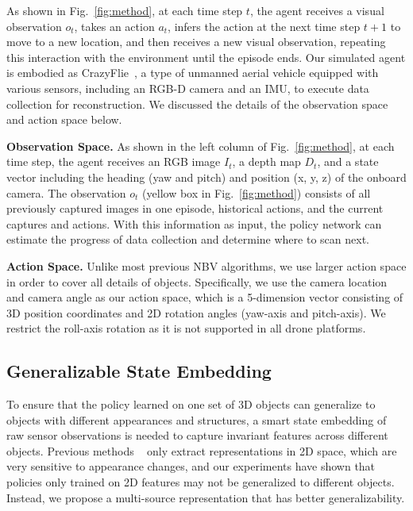     As shown in Fig.~\ref{fig:method}, at each time step $t$, the agent receives a visual observation $o_t$, takes an action $a_t$, infers the action at the next time step $t+1$ to move to a new location, and then receives a new visual observation, repeating this interaction with the environment until the episode ends. Our simulated agent is embodied as CrazyFlie~\citep{giernacki2017crazyflie}, a type of unmanned aerial vehicle equipped with various sensors, including an RGB-D camera and an IMU, to execute data collection for reconstruction. We discussed the details of the observation space and action space below.

    \vspace{1pt}
    \noindent\textbf{Observation Space.} As shown in the left column of Fig.~\ref{fig:method}, at each time step, the agent receives an RGB image $I_t$, a depth map $D_t$, and a state vector including the heading (yaw and pitch) and position (x, y, z) of the onboard camera.
    The observation $o_t$ (yellow box in Fig.~\ref{fig:method}) consists of all previously captured images in one episode, historical actions, and the current captures and actions. With this information as input, the policy network can estimate the progress of data collection and determine where to scan next.

    \vspace{1pt}
    \noindent\textbf{Action Space.} Unlike most previous NBV algorithms, we use larger action space in order to cover all details of objects. Specifically, we use the camera location and camera angle as our action space, which is a 5-dimension vector consisting of 3D position coordinates and 2D rotation angles (yaw-axis and pitch-axis). We restrict the roll-axis rotation as it is not supported in all drone platforms.

    

\subsection{Generalizable State Embedding}
\label{sec:method_state}
    To ensure that the policy learned on one set of 3D objects can generalize to objects with different appearances and structures, a smart state embedding of raw sensor observations is needed to capture invariant features across different objects. Previous methods ~\citep{peralta2020next, chaplotlearning} only extract representations in 2D space, which are very sensitive to appearance changes, and our experiments have shown that policies only trained on 2D features may not be generalized to different objects. Instead, we propose a multi-source representation that has better generalizability.

